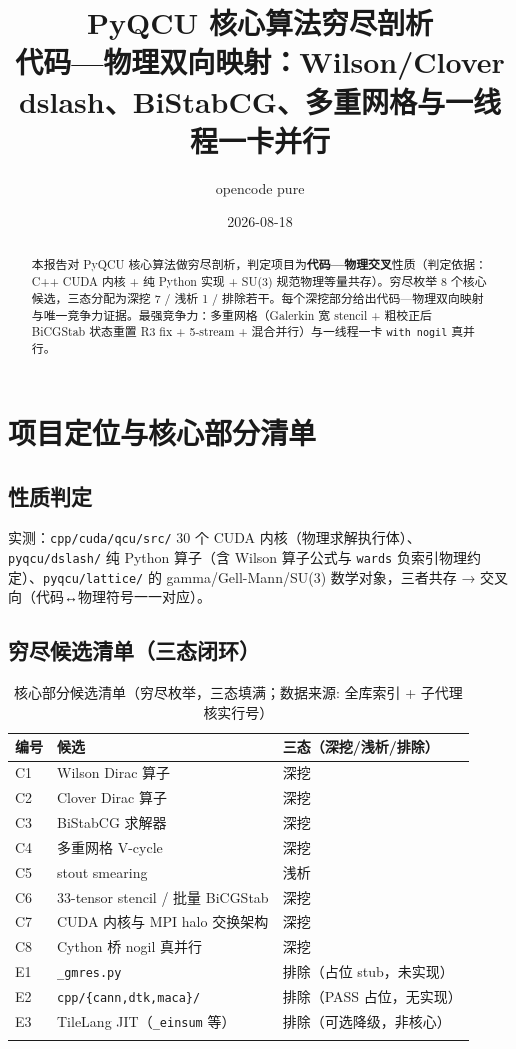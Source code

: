 \documentclass[UTF8]{ctexart}
\title{PyQCU 核心算法穷尽剖析\\[6pt]\large 代码—物理双向映射：Wilson/Clover dslash、BiStabCG、多重网格与一线程一卡并行}
\author{opencode pure}
\date{2026-08-18}
\begin{document}
\maketitle

\begin{abstract}
本报告对 PyQCU 核心算法做穷尽剖析，判定项目为\textbf{代码—物理交叉}性质（判定依据：C++ CUDA 内核 + 纯 Python 实现 + SU(3) 规范物理等量共存）。穷尽枚举 8 个核心候选，三态分配为深挖 7 / 浅析 1 / 排除若干。每个深挖部分给出代码—物理双向映射与唯一竞争力证据。最强竞争力：多重网格（Galerkin 宽 stencil + 粗校正后 BiCGStab 状态重置 R3 fix + 5-stream + 混合并行）与一线程一卡 \texttt{with nogil} 真并行。
\end{abstract}

\tableofcontents

\section{项目定位与核心部分清单}

\subsection{性质判定}
实测：\texttt{cpp/cuda/qcu/src/} 30 个 CUDA 内核（物理求解执行体）、\texttt{pyqcu/dslash/} 纯 Python 算子（含 Wilson 算子公式与 \texttt{wards} 负索引物理约定）、\texttt{pyqcu/lattice/} 的 gamma/Gell-Mann/SU(3) 数学对象，三者共存 → \textcolor{struct}{交叉向}（代码↔物理符号一一对应）。

\subsection{穷尽候选清单（三态闭环）}

\begin{xltabular}{\textwidth}{llX}
\toprule
编号 & 候选 & 三态（深挖/浅析/排除） \\
\midrule
\endhead
C1 & Wilson Dirac 算子 & \textcolor{struct}{深挖} \\
C2 & Clover Dirac 算子 & \textcolor{struct}{深挖} \\
C3 & BiStabCG 求解器 & \textcolor{struct}{深挖} \\
C4 & 多重网格 V-cycle & \textcolor{struct}{深挖} \\
C5 & stout smearing & 浅析 \\
C6 & 33-tensor stencil / 批量 BiCGStab & \textcolor{struct}{深挖} \\
C7 & CUDA 内核与 MPI halo 交换架构 & \textcolor{struct}{深挖} \\
C8 & Cython 桥 nogil 真并行 & \textcolor{struct}{深挖} \\
E1 & \texttt{\_gmres.py} & 排除（占位 stub，未实现） \\
E2 & \texttt{cpp/\{cann,dtk,maca\}/} & 排除（PASS 占位，无实现） \\
E3 & TileLang JIT（\texttt{\_einsum} 等） & 排除（可选降级，非核心） \\
\bottomrule
\caption{核心部分候选清单（穷尽枚举，三态填满；数据来源: 全库索引 + 子代理核实行号）}
\end{xltabular}
\end{document}
